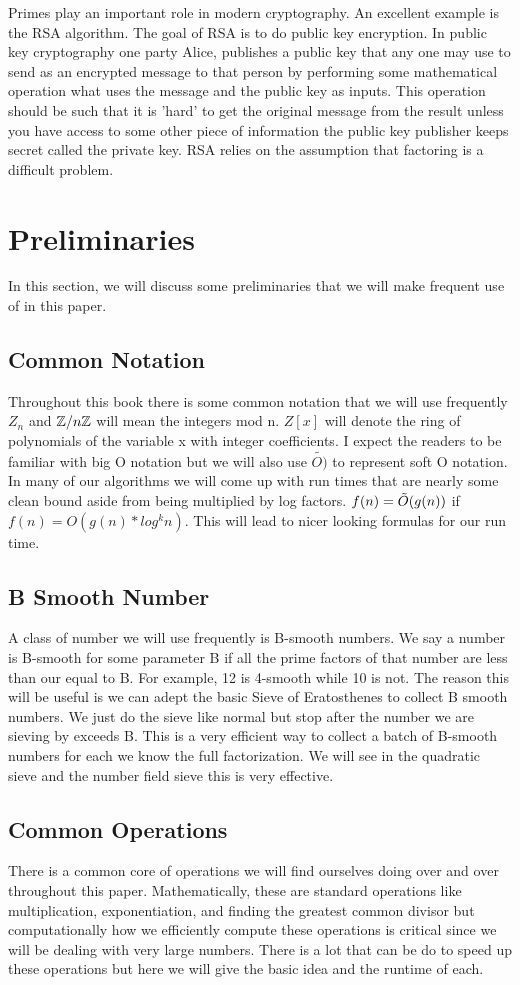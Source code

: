 \documentclass{article}
\begin{document}
Primes play an important role in modern cryptography. An excellent example is the RSA algorithm. The goal of RSA is to do public key encryption. In public key cryptography one party Alice, publishes a public key that any one may use to send as an encrypted message to that person by performing some mathematical operation what uses the message and the public key as inputs. This operation should be such that it is 'hard' to get the original message from the result unless you have access to some other piece of information the public key publisher keeps secret called the private key. RSA relies on the assumption that factoring is a difficult problem. 
\section{Preliminaries}
In this section, we will discuss some preliminaries that we will make frequent use of in this paper. 
\subsection{Common Notation}
Throughout this book there is some common notation that we will use frequently $Z_n$ and $\mathbb{Z} / n \mathbb{Z}$ will mean the integers mod n. $Z[x]$ will denote the ring of polynomials of the variable x with integer coefficients. I expect the readers to be familiar with big O notation but we will also use $\tilde{O)}$ to represent soft O notation. In many of our algorithms we will come up with run times that are nearly some clean bound aside from being multiplied by log factors. $f(n) = \tilde{O}(g(n))$ if $f(n) = O(g(n) * log^k n)$. This will lead to nicer looking formulas for our run time. 
\subsection{B Smooth Number}
A class of number we will use frequently is B-smooth numbers. We say a number is B-smooth for some parameter B if all the prime factors of that number are less than our equal to B. For example, 12 is 4-smooth while 10 is not. The reason this will be useful is we can adept the basic Sieve of Eratosthenes to collect B smooth numbers. We just do the sieve like normal but stop after the number we are sieving by exceeds B. This is a very efficient way to collect a batch of B-smooth numbers for each we know the full factorization. We will see in the quadratic sieve and the number field sieve this is very effective. 
\subsection{Common Operations}
There is a common core of operations we will find ourselves doing over and over throughout this paper. Mathematically, these are standard operations like  multiplication, exponentiation, and finding the greatest common divisor but computationally how we efficiently compute these operations is critical since we will be dealing with very large numbers. There is a lot that can be do to speed up these operations but here we will give the basic idea and the runtime of each. 
\end{document}
